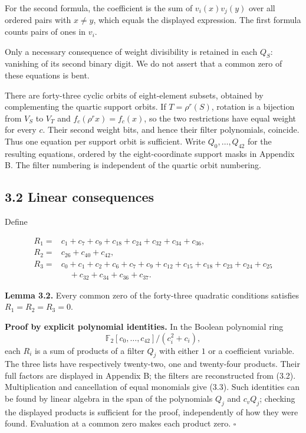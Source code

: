 \documentclass[11pt,a4paper]{article}
\begin{document}
For the second formula, the coefficient is the sum of $v_i(x)v_j(y)$ over all ordered pairs with $x\ne y$, which equals the displayed expression. The first formula counts pairs of ones in $v_i$.

Only a necessary consequence of weight divisibility is retained in each $Q_S$: vanishing of its second binary digit. We do not assert that a common zero of these equations is bent.

There are forty-three cyclic orbits of eight-element subsets, obtained by complementing the quartic support orbits. If $T=\rho^r(S)$, rotation is a bijection from $V_S$ to $V_T$ and $f_c(\rho^r x)=f_c(x)$, so the two restrictions have equal weight for every $c$. Their second weight bits, and hence their filter polynomials, coincide. Thus one equation per support orbit is sufficient. Write $Q_0,\ldots,Q_{42}$ for the resulting equations, ordered by the eight-coordinate support masks in Appendix B. The filter numbering is independent of the quartic orbit numbering.

\subsection*{3.2 Linear consequences}

Define

\[
\begin{aligned}
R_1={}&c_1+c_7+c_9+c_{18}+c_{24}+c_{32}+c_{34}+c_{36},\\
R_2={}&c_{26}+c_{40}+c_{42},\\
R_3={}&c_0+c_1+c_2+c_6+c_7+c_9+c_{12}+c_{15}+c_{18}
       +c_{23}+c_{24}+c_{25}\\&\quad+c_{32}+c_{34}+c_{36}+c_{37}.
\end{aligned} \tag{3.3}
\]

\textbf{Lemma 3.2.} Every common zero of the forty-three quadratic conditions satisfies $R_1=R_2=R_3=0$.

\textbf{Proof by explicit polynomial identities.} In the Boolean polynomial ring
\[\mathbb F_2[c_0,\ldots,c_{42}]/(c_i^2+c_i),\]
each $R_i$ is a sum of products of a filter $Q_j$ with either $1$ or a coefficient variable. The three lists have respectively twenty-two, one and twenty-four products. Their full factors are displayed in Appendix B; the filters are reconstructed from (3.2). Multiplication and cancellation of equal monomials give (3.3). Such identities can be found by linear algebra in the span of the polynomials $Q_j$ and $c_vQ_j$; checking the displayed products is sufficient for the proof, independently of how they were found. Evaluation at a common zero makes each product zero. \hfill$\square$
\end{document}
